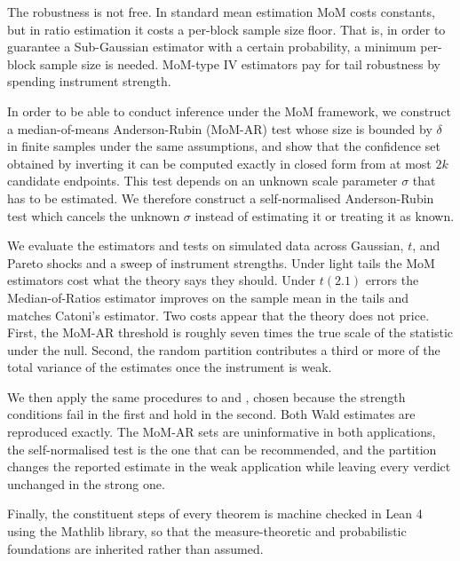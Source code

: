 The robustness is not free. In standard mean estimation MoM costs constants, but in ratio estimation it costs a per-block sample size floor. That is, in order to guarantee a Sub-Gaussian estimator with a certain probability, a minimum per-block sample size is needed. MoM-type IV estimators pay for tail robustness by spending instrument strength.

In order to be able to conduct inference under the MoM framework, we construct a median-of-means Anderson-Rubin (MoM-AR) test whose size is bounded by $\delta$ in finite samples under the same assumptions, and show that the confidence set obtained by inverting it can be computed exactly in closed form from at most $2k$ candidate endpoints. This test depends on an unknown scale parameter $\sigma$ that has to be estimated. We therefore construct a self-normalised Anderson-Rubin test which cancels the unknown $\sigma$ instead of estimating it or treating it as known.

We evaluate the estimators and tests on simulated data across Gaussian, $t$, and Pareto shocks and a sweep of instrument strengths. Under light tails the MoM estimators cost what the theory says they should. Under $t(2.1)$ errors the Median-of-Ratios estimator improves on the sample mean in the tails and matches Catoni's estimator. Two costs appear that the theory does not price. First, the MoM-AR threshold is roughly seven times the true scale of the statistic under the null. Second, the random partition contributes a third or more of the total variance of the estimates once the instrument is weak.

We then apply the same procedures to \citet{angrist1991does} and \citet{angrist1998children}, chosen because the strength conditions fail in the first and hold in the second. Both Wald estimates are reproduced exactly. The MoM-AR sets are uninformative in both applications, the self-normalised test is the one that can be recommended, and the partition changes the reported estimate in the weak application while leaving every verdict unchanged in the strong one.

Finally, the constituent steps of every theorem is machine checked in Lean 4 using the Mathlib library, so that the measure-theoretic and probabilistic foundations are inherited rather than assumed.
